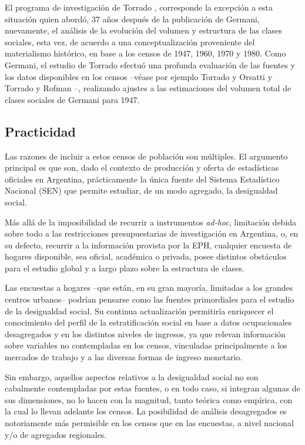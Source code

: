 \documentclass[
]{book}
\begin{document}
El programa de investigación de Torrado \citeyearpar{Torrado1992}, corresponde la excepción a esta situación quien abordó, 37 años después de la publicación de Germani, nuevamente, el análisis de la evolución del volumen y estructura de las clases sociales, esta vez, de acuerdo a una conceptualización proveniente del materialismo histórico, en base a los censos de 1947, 1960, 1970 y 1980. Como Germani, el estudio de Torrado efectuó una profunda evaluación de las fuentes y los datos disponibles en los censos --véase por ejemplo Torrado y Orsatti \citeyearpar{Torrado1985} y Torrado y Rofman \citeyearpar{Torrado1988}--, realizando ajustes a las estimaciones del volumen total de clases sociales de Germani para 1947.

\hypertarget{practicidad}{%
\subsection{Practicidad}\label{practicidad}}

Las razones de incluir a estos censos de población son múltiples. El argumento principal es que son, dado el contexto de producción y oferta de estadísticas oficiales en Argentina, prácticamente la única fuente del Sistema Estadístico Nacional (SEN) que permite estudiar, de un modo agregado, la desigualdad social.

Más allá de la imposibilidad de recurrir a instrumentos \emph{ad-hoc}, limitación debida sobre todo a las restricciones presupuestarias de investigación en Argentina, o, en su defecto, recurrir a la información provista por la EPH, cualquier encuesta de hogares disponible, sea oficial, académica o privada, posee distintos obstáculos para el estudio global y a largo plazo sobre la estructura de clases.

Las encuestas a hogares --que están, en su gran mayoría, limitadas a los grandes centros urbanos-- podrían pensarse como las fuentes primordiales para el estudio de la desigualdad social. Su continua actualización permitiría enriquecer el conocimiento del perfil de la estratificación social en base a datos ocupacionales desagregados y en los distintos niveles de ingresos, ya que relevan información sobre variables no contempladas en los censos, vinculadas principalmente a los mercados de trabajo y a las diversas formas de ingreso monetario.

Sin embargo, aquellos aspectos relativos a la desigualdad social no son cabalmente contempladas por estas fuentes, o en todo caso, si integran algunas de sus dimensiones, no lo hacen con la magnitud, tanto teórica como empírica, con la cual lo llevan adelante los censos. La posibilidad de análisis desagregados es notoriamente más permisible en los censos que en las encuestas, a nivel nacional y/o de agregados regionales.
\end{document}
